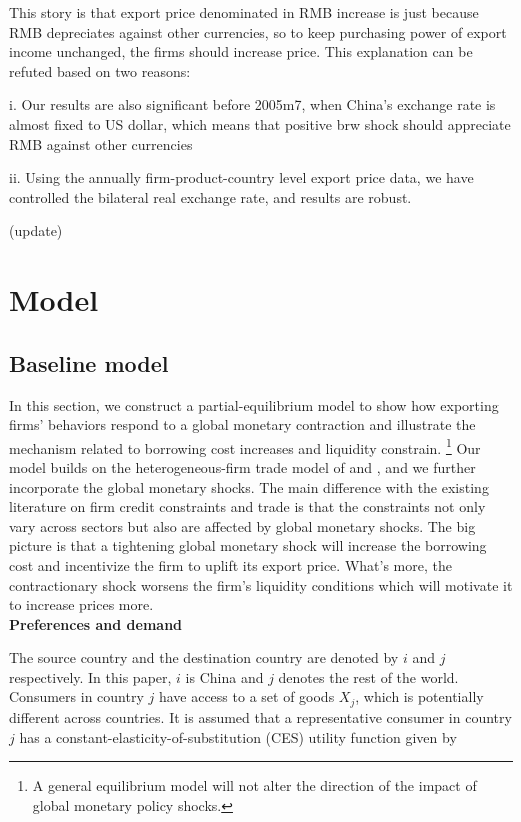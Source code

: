 \documentclass[12pt]{article}
\begin{document}
This story is that export price denominated in RMB increase is just because RMB depreciates against other currencies, so to keep purchasing power of export income unchanged, the firms should increase price. This explanation can be refuted based on two reasons:

i. Our results are also significant before 2005m7, when China’s exchange rate is almost fixed to US dollar, which means that positive brw shock should appreciate RMB against other currencies


ii. Using the annually firm-product-country level export price data, we have controlled the bilateral real exchange rate, and results are robust.

(update)


\section{Model}

\subsection{Baseline model}
 In this section, we construct a partial-equilibrium model to show how exporting firms' behaviors respond to a global monetary contraction and illustrate the mechanism related to borrowing cost increases and liquidity constrain.  \footnote{A general equilibrium model will not alter the direction of the impact of global monetary policy shocks.} Our model builds on the heterogeneous-firm trade model of \cite{melitz2003impact} and \cite{manova2013credit}, and we further incorporate the global monetary shocks. The main difference with the existing literature on firm credit constraints and trade is that the constraints not only vary across sectors but also are affected by global monetary shocks. The big picture is that a tightening global monetary shock will increase the borrowing cost and incentivize the firm to uplift its export price. What’s more, the contractionary shock worsens the firm's liquidity conditions which will motivate it to increase prices more. \\


\textbf{Preferences and demand}

The source country and the destination country are denoted by $i$ and $j$ respectively. In this paper, $i$ is China and $j$ denotes the rest of the world. Consumers in country $j$ have access to a set of goods $X_j$, which is potentially different across countries. It is assumed that a representative consumer in country $j$ has a constant-elasticity-of-substitution (CES) utility function given by
\end{document}
